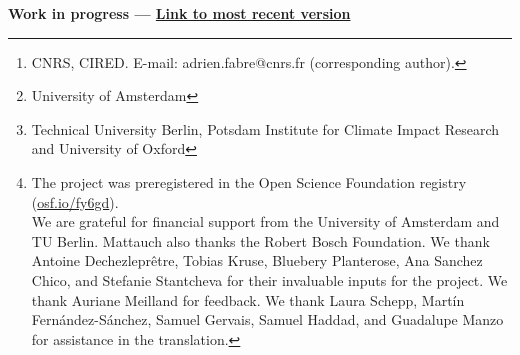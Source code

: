 \author{Adrien Fabre$^{1,2}$, Thomas Douenne$^3$ and Linus Mattauch$^{4,5,6}$} %
\author{Adrien Fabre\footnote{CNRS, CIRED. E-mail: adrien.fabre@cnrs.fr (corresponding author).}, Thomas Douenne\footnote{University of Amsterdam}\; and Linus Mattauch\footnote{Technical University Berlin, Potsdam Institute for Climate Impact Research and University of Oxford}~~\thanks{The project %
was preregistered in the Open Science Foundation registry (\href{https://osf.io/fy6gd}{osf.io/fy6gd}). \\ We are grateful for financial support from the University of Amsterdam and TU Berlin. Mattauch also thanks the Robert Bosch Foundation. %
We thank Antoine Dechezleprêtre, Tobias Kruse, Bluebery Planterose, Ana Sanchez Chico, and Stefanie Stantcheva for their invaluable inputs for the project. We thank Auriane Meilland for feedback. We thank Laura Schepp, Martín Fernández-Sánchez, Samuel Gervais, Samuel Haddad, and Guadalupe Manzo for assistance in the translation. }} %

\date{\today} %



\maketitle

\begin{center}
{\textbf{Work in progress --- \href{https://github.com/bixiou/global_tax_attitudes/raw/main/paper/draft.pdf}{Link to most recent version}}}
\end{center}



